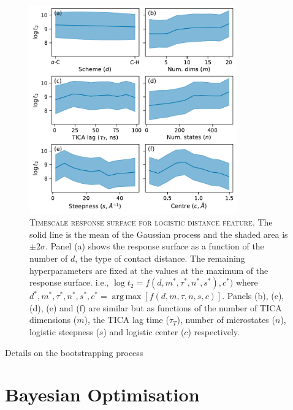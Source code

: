 \documentclass{article}
\DeclareMathOperator*{\argmax}{arg\,max}
\begin{document}
\begin{figure}
    \centering
    \includegraphics[width=0.8\textwidth]{figures/response_surface_marginal_distances_logistic_ts.pdf}
    \caption{\textsc{Timescale response surface for logistic distance feature}. The solid line is the mean of the Gaussian process and the shaded area is $\pm 2\sigma$. Panel (a) shows the response surface as a function of the number of $d$, the type of contact distance. The remaining hyperparameters are fixed at the values at the maximum of the response surface. i.e., $\log{t_2}=f(d, m^{*}, \tau^{*}, n^{*}, s^{*}), c^{*})$ where $d^{*}, m^{*}, \tau^{*}, n^{*}, s^{*}, c^{*} = \argmax \left [f(d,  m, \tau,n, s, c)\right]$. Panels (b), (c), (d), (e) and (f) are similar but as functions of the number of TICA dimensions ($m$), the TICA lag time ($\tau_{T}$), number of microstates ($n$), logistic steepness ($s$) and logistic center ($c$) respectively.}
    \label{fig:repsonse_logistic}
\end{figure}


Details on the bootstrapping process


\section{Bayesian Optimisation}
\end{document}
